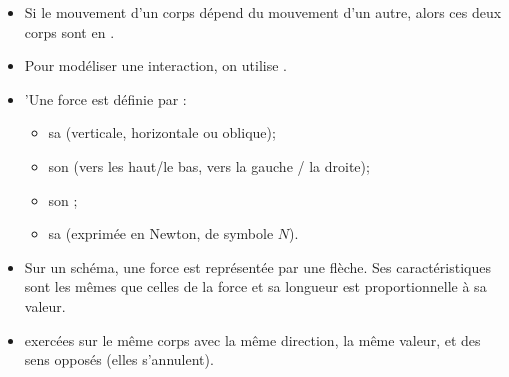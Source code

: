 \begin{mybilan}
	\begin{itemize}
		
		\item Si le mouvement d'un corps dépend du mouvement d'un autre, alors ces deux corps sont en .
		
		\item Pour modéliser une interaction, on utilise .
		
		\item 'Une force est définie par :
			\begin{itemize}
				\item sa  (verticale, horizontale ou oblique);
				\item son  (vers les haut/le bas, vers la gauche / la droite);
				\item son ;
				\item sa  (exprimée en Newton, de symbole $N$).
			\end{itemize}
		
		\item Sur un schéma, une force est représentée par une flèche. Ses caractéristiques sont les mêmes que celles de la force et sa longueur est proportionnelle à sa valeur.
		
		\item {} exercées sur le même corps avec la même direction, la même valeur, et des sens opposés  (elles s'annulent).
	\end{itemize}
\end{mybilan}